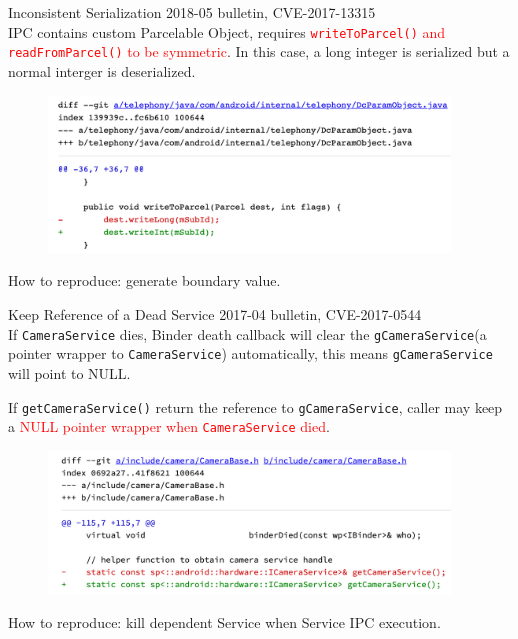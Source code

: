 \documentclass[notheorems, aspectratio=54]{beamer}
\begin{document}
\begin{frame}
	\begin{block}{Inconsistent Serialization}
		2018-05 bulletin, CVE-2017-13315
		\\[1ex]
		\scriptsize{IPC contains custom Parcelable Object, requires \textcolor{red}{\texttt{writeToParcel()} and \texttt{readFromParcel()} to be symmetric}. In this case, a long integer is serialized but a normal interger is deserialized.}
		
		\begin{figure}
			\centering
			\includegraphics[width=0.95\textwidth]{res/case-study-inconsistent-serialization.png}
			\vspace*{-0.3cm}
		\end{figure}
	\end{block}
	
	How to reproduce: generate boundary value.
	
\end{frame}

\begin{frame}
	\begin{block}{Keep Reference of a Dead Service}
		2017-04 bulletin, CVE-2017-0544
		\\[1ex]
		\scriptsize{If \texttt{CameraService} dies, Binder death callback will clear the \texttt{gCameraService}(a pointer wrapper to \texttt{CameraService})} automatically, this means \texttt{gCameraService} will point to NULL. 
		 
		If \texttt{getCameraService()} return the reference to \texttt{gCameraService}, caller may keep a \textcolor{red}{NULL pointer wrapper when \texttt{CameraService} died}.
		
		\begin{figure}
			\centering
			\includegraphics[width=0.95\textwidth]{res/case-study-reference-to-dead-service.png}
			\vspace*{-0.3cm}
		\end{figure}
	\end{block}

	How to reproduce: kill dependent Service when Service IPC execution.

\end{frame}
\end{document}
